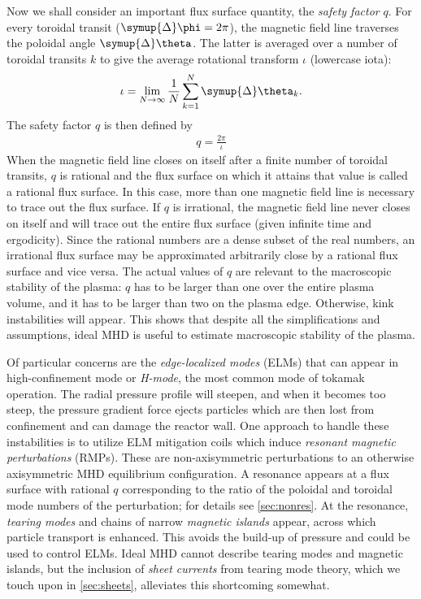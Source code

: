 Now we shall consider an important flux surface quantity, the \emph{safety factor} $q$. For every toroidal transit ($\symup{\Delta} \phi = 2 \pi$), the magnetic field line traverses the poloidal angle $\symup{\Delta} \theta$. The latter is averaged over a number of toroidal transits $k$ to give the average rotational transform $\iota$ (lowercase iota):
\begin{gather}
  \iota = \lim_{N \to \infty} \frac{1}{N} \sum_{k = 1}^{N} \symup{\Delta} \theta_{k}.
\end{gather}
The safety factor $q$ is then defined by
\begin{gather}
  q = \frac{2 \pi}{\iota}
\end{gather}
When the magnetic field line closes on itself after a finite number of toroidal transits, $q$ is rational and the flux surface on which it attains that value is called a rational flux surface. In this case, more than one magnetic field line is necessary to trace out the flux surface. If $q$ is irrational, the magnetic field line never closes on itself and will trace out the entire flux surface (given infinite time and ergodicity). Since the rational numbers are a dense subset of the real numbers, an irrational flux surface may be approximated arbitrarily close by a rational flux surface and vice versa. The actual values of $q$ are relevant to the macroscopic stability of the plasma: $q$ has to be larger than one over the entire plasma volume, and it has to be larger than two on the plasma edge. Otherwise, kink instabilities will appear. This shows that despite all the simplifications and assumptions, ideal MHD is useful to estimate macroscopic stability of the plasma.

Of particular concerns are the \emph{edge-localized modes} (ELMs) that can appear in high-confinement mode or \emph{H-mode}, the most common mode of tokamak operation. The radial pressure profile will steepen, and when it becomes too steep, the pressure gradient force ejects particles which are then lost from confinement and can damage the reactor wall. One approach to handle these instabilities is to utilize ELM mitigation coils which induce \emph{resonant magnetic perturbations} (RMPs). These are non-axisymmetric perturbations to an otherwise axisymmetric MHD equilibrium configuration. A resonance appears at a flux surface with rational $q$ corresponding to the ratio of the poloidal and toroidal mode numbers of the perturbation; for details see \cref{sec:nonres}. At the resonance, \emph{tearing modes} and chains of narrow \emph{magnetic islands} appear, across which particle transport is enhanced. This avoids the build-up of pressure and could be used to control ELMs. Ideal MHD cannot describe tearing modes and magnetic islands, but the inclusion of \emph{sheet currents} from tearing mode theory, which we touch upon in \cref{sec:sheets}, alleviates this shortcoming somewhat.

